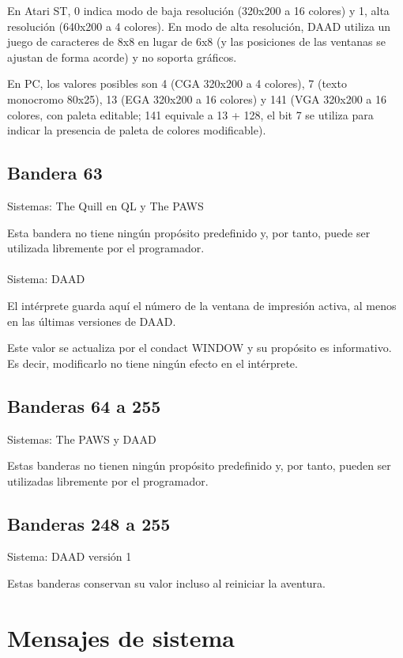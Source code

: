 \documentclass[11pt, a5paper]{article}
\newcommand{\quill}{\textsf{The Quill}\xspace}
\newcommand{\paw}{\textsf{The PAWS}\xspace}
\newcommand{\daad}{\textsf{DAAD}\xspace}
\newcommand{\sistema}[1]{\noindent Sistema: #1 \nopagebreak}
\newcommand{\sistemas}[1]{\noindent Sistemas: #1 \nopagebreak}
\begin{document}
En Atari ST, 0 indica modo de baja resolución (320x200 a 16 colores) y 1, alta resolución (640x200 a 4 colores). En modo de alta resolución, \daad utiliza un juego de caracteres de 8x8 en lugar de 6x8 (y las posiciones de las ventanas se ajustan de forma acorde) y no soporta gráficos.

En PC, los valores posibles son 4 (CGA 320x200 a 4 colores), 7 (texto monocromo 80x25), 13 (EGA 320x200 a 16 colores) y 141 (VGA 320x200 a 16 colores, con paleta editable; 141 equivale a 13 + 128, el bit 7 se utiliza para indicar la presencia de paleta de colores modificable).

\subsection{Bandera 63}

\sistemas{\quill en QL y \paw}

Esta bandera no tiene ningún propósito predefinido y, por tanto, puede ser utilizada libremente por el programador.
\\\ \\
\sistema{\daad}

El intérprete guarda aquí el número de la ventana de impresión activa, al menos en las últimas versiones de \daad. \cite[pág. 62]{DAAD}

Este valor se actualiza por el condact WINDOW y su propósito es informativo. Es decir, modificarlo no tiene ningún efecto en el intérprete.

\subsection{Banderas 64 a 255}

\sistemas{\paw y \daad}

Estas banderas no tienen ningún propósito predefinido y, por tanto, pueden ser utilizadas libremente por el programador.

\subsection{Banderas 248 a 255}

\sistema{\daad versión 1}

Estas banderas conservan su valor incluso al reiniciar la aventura.


\section{Mensajes de sistema}
\end{document}
